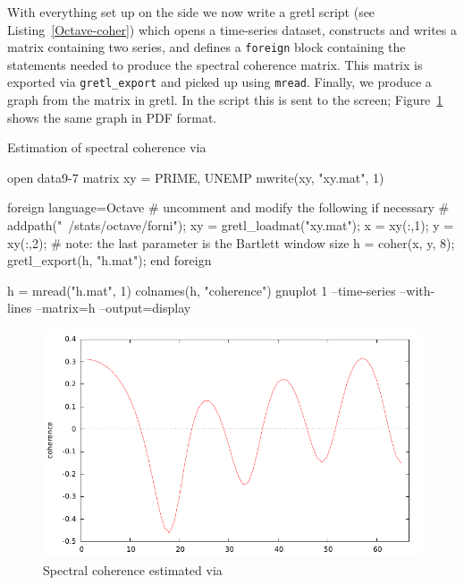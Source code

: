 With everything set up on the  side we now write a gretl
script (see Listing~\ref{Octave-coher}) which opens a time-series
dataset, constructs and writes a matrix containing two series, and
defines a \texttt{foreign} block containing the 
statements needed to produce the spectral coherence matrix. This
matrix is exported via \verb|gretl_export| and picked up using
\texttt{mread}. Finally, we produce a graph from the matrix in gretl.
In the script this is sent to the screen; Figure~\ref{fig:coherence}
shows the same graph in PDF format.

\begin{script}[htbp]
  \caption{Estimation of spectral coherence via }
\begin{scode}
open data9-7
matrix xy = { PRIME, UNEMP }
mwrite(xy, "xy.mat", 1)

foreign language=Octave
 # uncomment and modify the following if necessary
 # addpath("~/stats/octave/forni");
 xy = gretl_loadmat("xy.mat");
 x = xy(:,1);
 y = xy(:,2);
 # note: the last parameter is the Bartlett window size
 h = coher(x, y, 8);
 gretl_export(h, "h.mat");
end foreign

h = mread("h.mat", 1)
colnames(h, "coherence")
gnuplot 1 --time-series --with-lines --matrix=h --output=display
\end{scode}
\label{Octave-coher}
\end{script}

\begin{figure}[htbp]
  \centering
  \includegraphics{figures/coherence}
  \caption{Spectral coherence estimated via }
  \label{fig:coherence}
\end{figure}



